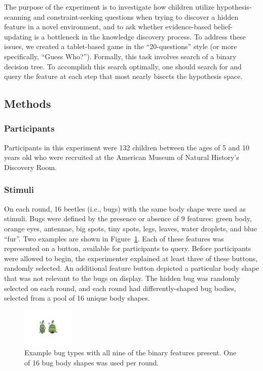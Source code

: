 \documentclass[10pt,letterpaper]{article}
\begin{document}
The purpose of the experiment is to investigate how children utilize hypothesis-
scanning and constraint-seeking questions when trying to discover a hidden feature 
in a novel environment, and to ask whether evidence-based belief-updating is a 
bottleneck in the knowledge discovery process. To address these issues, we created 
a tablet-based game in the ``20-questions'' style (or more specifically, ``Guess 
Who?''). Formally, this task involves search of a binary decision tree. To accomplish 
this search optimally, one should search for and query the feature at each step that 
most nearly bisects the hypothesis space.

\subsection{Methods}

\subsubsection{Participants}

Participants in this experiment were 132 children between the ages of 5 and 10 
years old who were recruited at the American Museum of Natural History's 
Discovery Room.

\subsubsection{Stimuli}

On each round, 16 beetles (i.e., bugs) with the same body shape were used as 
stimuli. Bugs were defined by the presence or absence of 9 features: green body, 
orange eyes, antennae, big spots, tiny spots, legs, leaves, water droplets, and blue 
``fur''. Two examples are shown in Figure~\ref{fig:example_bugs}. Each of these 
features was represented on a button, available for participants to query. Before 
participants were allowed to begin, the experimenter explained at least three of 
these buttons, randomly selected. An additional feature button depicted a particular 
body shape that was not relevant to the bugs on display. The hidden bug was 
randomly selected on each round, and each round had differently-shaped bug 
bodies, selected from a pool of 16 unique body shapes.

\begin{figure}[h]
  \centering
  \includegraphics[width=0.22\textwidth]{figures/example_bugs}
  \caption{Example bug types with all nine of the binary features present. One of 16 
bug body shapes was used per round.}
  \label{fig:example_bugs}
\end{figure} 
\end{document}

